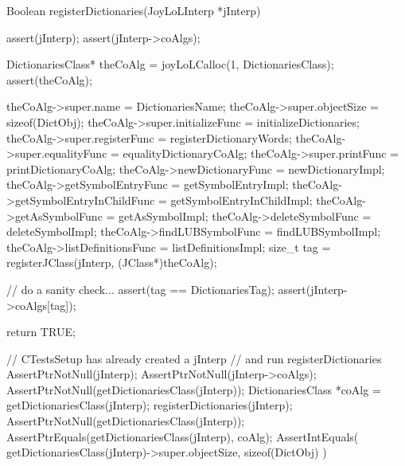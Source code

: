 \startCCode
Boolean registerDictionaries(JoyLoLInterp *jInterp) {
  assert(jInterp);
  assert(jInterp->coAlgs);
  
  DictionariesClass* theCoAlg
    = joyLoLCalloc(1, DictionariesClass);
  assert(theCoAlg);
  
  theCoAlg->super.name                = DictionariesName;
  theCoAlg->super.objectSize          = sizeof(DictObj);
  theCoAlg->super.initializeFunc      = initializeDictionaries;
  theCoAlg->super.registerFunc        = registerDictionaryWords;
  theCoAlg->super.equalityFunc        = equalityDictionaryCoAlg;
  theCoAlg->super.printFunc           = printDictionaryCoAlg;
  theCoAlg->newDictionaryFunc         = newDictionaryImpl;
  theCoAlg->getSymbolEntryFunc        = getSymbolEntryImpl;
  theCoAlg->getSymbolEntryInChildFunc = getSymbolEntryInChildImpl;
  theCoAlg->getAsSymbolFunc           = getAsSymbolImpl;
  theCoAlg->deleteSymbolFunc          = deleteSymbolImpl;
  theCoAlg->findLUBSymbolFunc         = findLUBSymbolImpl;
  theCoAlg->listDefinitionsFunc       = listDefinitionsImpl;  
  size_t tag =
    registerJClass(jInterp, (JClass*)theCoAlg);
  
  // do a sanity check...
  assert(tag == DictionariesTag);
  assert(jInterp->coAlgs[tag]);
   
  return TRUE;
}
\stopCCode


\startCTest
  // CTestsSetup has already created a jInterp
  // and run registerDictionaries
  AssertPtrNotNull(jInterp);
  AssertPtrNotNull(jInterp->coAlgs);
  AssertPtrNotNull(getDictionariesClass(jInterp));
  DictionariesClass *coAlg = getDictionariesClass(jInterp);
  registerDictionaries(jInterp);
  AssertPtrNotNull(getDictionariesClass(jInterp));
  AssertPtrEquals(getDictionariesClass(jInterp), coAlg);
  AssertIntEquals(
    getDictionariesClass(jInterp)->super.objectSize,
    sizeof(DictObj)
  )
\stopCTest
\stopTestCase
\stopTestSuite
